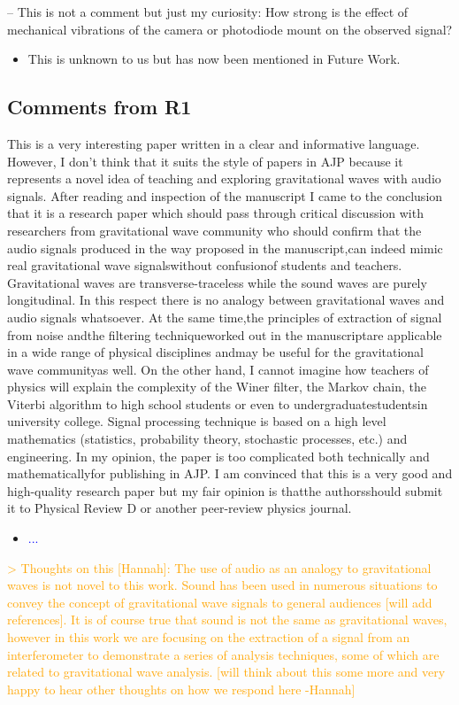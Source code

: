 \documentclass{article}
\newcommand{\todo}{\textcolor{blue}}
\newcommand{\han}{\textcolor{orange}}
\begin{document}
\noindent
-- This is not a comment but just my curiosity: How strong is the effect of mechanical vibrations of the camera or photodiode mount on the observed signal?
\begin{itemize}
\item This is unknown to us but has now been mentioned in Future Work.
\end{itemize}



\subsection{Comments from R1}

This is a very interesting paper written in a clear and informative language. However, I don’t think that it suits the style of papers in AJP because it represents a novel idea of teaching and exploring gravitational waves with audio signals. After reading and inspection of the manuscript I came to the  conclusion  that it is a  research  paper  which should pass  through critical discussion  with researchers  from gravitational  wave  community who  should  confirm  that  the audio signals produced in the way proposed in the manuscript,can indeed mimic real gravitational wave signalswithout confusionof students and teachers. Gravitational waves are transverse-traceless while the sound waves are purely longitudinal. In this respect there is no analogy between gravitational waves and audio signals whatsoever. At the same time,the principles of extraction of signal from noise andthe filtering techniqueworked out in the manuscriptare applicable in a wide range of physical disciplines andmay be useful for the gravitational wave communityas well. On the other hand, I cannot imagine how teachers of physics will explain the complexity of the Winer filter, the Markov chain, the Viterbi algorithm to high school students or even to undergraduatestudentsin university college. Signal  processing technique is based  on a  high  level  mathematics (statistics, probability theory, stochastic processes, etc.) and engineering. In my opinion, the paper is too complicated both technically and mathematicallyfor publishing in AJP. I am convinced that this is a very good and high-quality research  paper but  my  fair  opinion  is  thatthe authorsshould submit  it  to  Physical Review D or another peer-review physics journal. 
\begin{itemize}
\item \todo{...}
\end{itemize}



\han{> Thoughts on this [Hannah]: The use of audio as an analogy to gravitational waves is not novel to this work. Sound has been used in numerous situations to convey the concept of gravitational wave signals to general audiences [will add references]. It is of course true that sound is not the same as gravitational waves, however in this work we are focusing on the extraction of a signal from an interferometer to demonstrate a series of analysis techniques, some of which are related to gravitational wave analysis. [will think about this some more and very happy to hear other thoughts on how we respond here -Hannah]}
\end{document}
